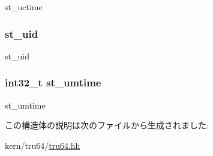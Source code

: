 st\_\-uctime \hypertarget{structTru64__F64_1_1F64__stat_aaa7d1c91bc417749646433fe7b0c4214}{
\subsubsection[{st\_\-uid}]{ {\bf st\_\-uid}}}
\label{structTru64__F64_1_1F64__stat_aaa7d1c91bc417749646433fe7b0c4214}


st\_\-uid \hypertarget{structTru64__F64_1_1F64__stat_a16037ac74c7c2f8a1f7ded265cc777d4}{
\subsubsection[{st\_\-umtime}]{\setlength{\rightskip}{0pt plus 5cm}int32\_\-t {\bf st\_\-umtime}}}
\label{structTru64__F64_1_1F64__stat_a16037ac74c7c2f8a1f7ded265cc777d4}


st\_\-umtime 

この構造体の説明は次のファイルから生成されました:\begin{DoxyCompactItemize}
\item 
kern/tru64/\hyperlink{kern_2tru64_2tru64_8hh}{tru64.hh}\end{DoxyCompactItemize}
